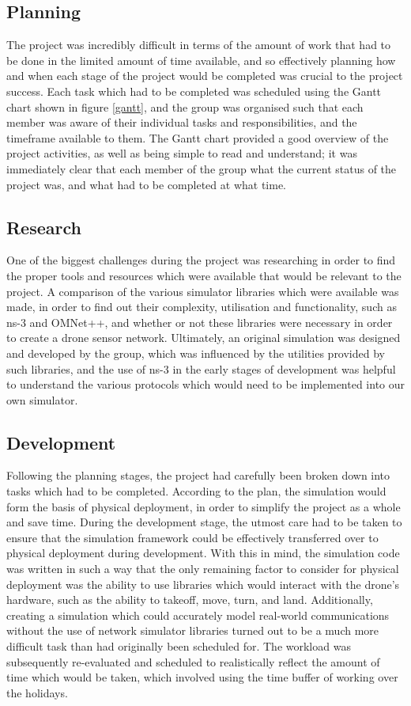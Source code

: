 \subsection{Planning}
The project was incredibly difficult in terms of the amount of work that had to be done in the limited amount of time available, and so effectively planning how and when each stage of the project would be completed was crucial to the project success. Each task which had to be completed was scheduled using the Gantt chart shown in figure \ref{gantt}, and the group was organised such that each member was aware of their individual tasks and responsibilities, and the timeframe available to them. The Gantt chart provided a good overview of the project activities, as well as being simple to read and understand; it was immediately clear that each member of the group what the current status of the project was, and what had to be completed at what time.

\subsection{Research}
One of the biggest challenges during the project was researching in order to find the proper tools and resources which were available that would be relevant to the project. A comparison of the various simulator libraries which were available was made, in order to find out their complexity, utilisation and functionality, such as ns-3 and OMNet++, and whether or not these libraries were necessary in order to create a drone sensor network. Ultimately, an original simulation was designed and developed by the group, which was influenced by the utilities provided by such libraries, and the use of ns-3 in the early stages of development was helpful to understand the various protocols which would need to be implemented into our own simulator.

\subsection{Development}
Following the planning stages, the project had carefully been broken down into tasks which had to be completed. According to the plan, the simulation would form the basis of physical deployment, in order to simplify the project as a whole and save time. During the development stage, the utmost care had to be taken to ensure that the simulation framework could be effectively transferred over to physical deployment during development. With this in mind, the simulation code was written in such a way that the only remaining factor to consider for physical deployment was the ability to use libraries which would interact with the drone's hardware, such as the ability to takeoff, move, turn, and land. Additionally, creating a simulation which could accurately model real-world communications without the use of network simulator libraries turned out to be a much more difficult task than had originally been scheduled for. The workload was subsequently re-evaluated and scheduled to realistically reflect the amount of time which would be taken, which involved using the time buffer of working over the holidays.

